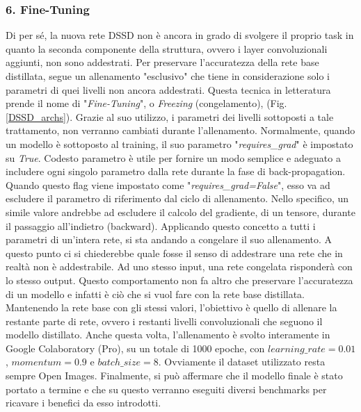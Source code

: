 \subsubsection{6. Fine-Tuning}
Di per sé, la nuova rete DSSD non è ancora in grado di svolgere il proprio 
task in quanto la seconda componente della struttura, ovvero i layer convoluzionali 
aggiunti, non sono addestrati. Per preservare l'accuratezza della rete 
base distillata, segue un allenamento "esclusivo" che tiene in considerazione 
solo i parametri di quei livelli non ancora addestrati. Questa tecnica in 
letteratura prende il nome di "\emph{Fine-Tuning}", o \emph{Freezing} (congelamento), (Fig. \ref{DSSD_archs}). Grazie al suo utilizzo, i 
parametri dei livelli sottoposti a tale trattamento, non verranno cambiati 
durante l'allenamento. Normalmente, quando un modello è sottoposto al 
training, il suo parametro "\emph{requires\_grad}" è impostato su \emph{True}. Codesto 
parametro è utile per fornire un modo semplice e adeguato a includere ogni 
singolo parametro dalla rete durante la fase di back-propagation. Quando 
questo flag viene impostato come "\emph{requires\_grad=False}", esso va ad 
escludere il parametro di riferimento dal ciclo di allenamento. Nello specifico, 
un simile valore andrebbe ad escludere il calcolo del gradiente, di un 
tensore, durante il passaggio all'indietro (backward). Applicando questo 
concetto a tutti i parametri di un'intera rete, si sta andando a congelare il 
suo allenamento. A questo punto ci si chiederebbe quale fosse il senso di 
addestrare una rete che in realtà non è addestrabile. Ad uno stesso input, 
una rete congelata risponderà con lo stesso output. Questo comportamento 
non fa altro che preservare l'accuratezza di un modello e infatti è ciò che 
si vuol fare con la rete base distillata. Mantenendo la rete base con gli 
stessi valori, l'obiettivo è quello di allenare la restante parte di rete, ovvero i 
restanti livelli convoluzionali che seguono il modello distillato. Anche questa 
volta, l'allenamento è svolto interamente in Google Colaboratory (Pro), su 
un totale di 1000 epoche, con $learning\_rate=0.01$, $momentum=0.9$ 
e $batch\_size=8$. Ovviamente il dataset utilizzato resta sempre Open 
Images. Finalmente, si può affermare che il modello finale è stato portato a 
termine e che su questo verranno eseguiti diversi benchmarks per ricavare i 
benefici da esso introdotti.  

